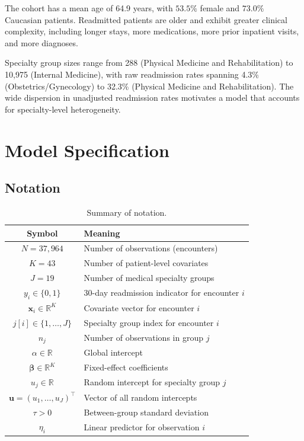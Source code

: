 \documentclass[10pt]{article}
\newcommand{\bx}{\bm{x}}
\newcommand{\bbeta}{\bm{\beta}}
\newcommand{\bu}{\bm{u}}
\begin{document}
The cohort has a mean age of 64.9 years, with $53.5\%$ female and $73.0\%$ Caucasian patients. Readmitted patients are older and exhibit greater clinical complexity, including longer stays, more medications, more prior inpatient visits, and more diagnoses.

Specialty group sizes range from 288 (Physical Medicine and Rehabilitation) to
10,975 (Internal Medicine), with raw readmission rates spanning 4.3\%
(Obstetrics/Gynecology) to 32.3\% (Physical Medicine and Rehabilitation).
The wide dispersion in unadjusted readmission rates motivates a model that accounts for specialty-level heterogeneity.

\section{Model Specification}
\label{sec:model}

\subsection{Notation}

\begin{table}[H]
\centering
\small
\caption{Summary of notation.}
\label{tab:notation}
\begin{tabular}{cl}
\toprule
Symbol & Meaning \\
\midrule
$N = 37{,}964$ & Number of observations (encounters) \\
$K = 43$        & Number of patient-level covariates \\
$J = 19$        & Number of medical specialty groups \\
$y_i \in \{0,1\}$ & 30-day readmission indicator for encounter $i$ \\
$\bx_i \in \mathbb{R}^K$ & Covariate vector for encounter $i$ \\
$j[i] \in \{1,\dots,J\}$ & Specialty group index for encounter $i$ \\
$n_j$ & Number of observations in group $j$ \\
$\alpha \in \mathbb{R}$ & Global intercept \\
$\bbeta \in \mathbb{R}^K$ & Fixed-effect coefficients \\
$u_j \in \mathbb{R}$ & Random intercept for specialty group $j$ \\
$\bu = (u_1,\dots,u_J)^\top$ & Vector of all random intercepts \\
$\tau > 0$ & Between-group standard deviation \\
$\eta_i$ & Linear predictor for observation $i$ \\
\bottomrule
\end{tabular}
\end{table}
\end{document}
